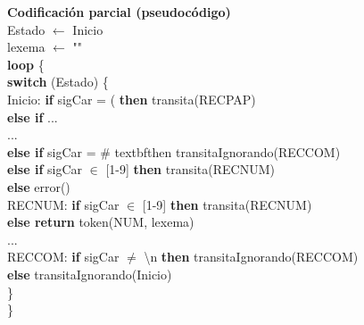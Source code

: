 \documentclass[\main/ApuntesPL.tex]{subfiles}
\begin{document}
      \newpage
      \par
      \textbf{Codificación parcial (pseudocódigo)}\\
      \vspace{5mm}
      \hspace{5mm}Estado $\leftarrow$ Inicio\\
      \hspace{5mm}lexema $\leftarrow$ ""\\
      \hspace{5mm}\textbf{loop} \{\\
      \hspace{10mm}\textbf{switch} (Estado) \{\\
      \hspace{10mm}Inicio: \textbf{if} sigCar = ( \textbf{then} transita(RECPAP)\\
      \hspace{22mm}\textbf{else if} ...\\
      \hspace{22mm}...\\
      \hspace{22mm}\textbf{else if} sigCar = \# textbf{then} transitaIgnorando(RECCOM)\\
      \hspace{22mm}\textbf{else if} sigCar $\in$ [1-9] \textbf{then} transita(RECNUM)\\
      \hspace{22mm}\textbf{else} error()\\
      \vspace{2mm}
      \hspace{10mm}RECNUM: \textbf{if} sigCar $\in$ [1-9] \textbf{then} transita(RECNUM)\\
      \hspace{30mm}\textbf{else return} token(NUM, lexema)\\
      \vspace{2mm}
      \hspace{10mm}...\\
      \vspace{2mm}
      \hspace{10mm}RECCOM: \textbf{if} sigCar $\neq$ \textbackslash n \textbf{then} transitaIgnorando(RECCOM)\\
      \hspace{30mm}\textbf{else} transitaIgnorando(Inicio)\\
      \hspace{10mm}\}\\
      \hspace{5mm}\}\\
\end{document}
